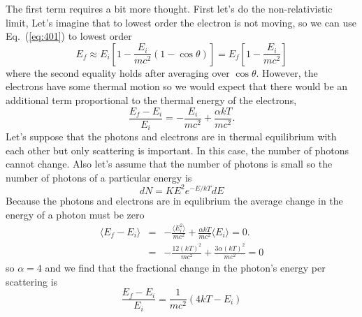 The first term requires a bit more thought.   First let's do the
non-relativistic limit,  Let's imagine that to lowest order the
electron is not moving, so we can use Eq.~(\ref{eq:401}) to lowest order
\begin{equation}
E_f \approx E_i \left [ 1 - \frac{E_i}{mc^2} \left ( 1 - \cos\theta \right )
  \right ] = E_f \left [ 1 - \frac{E_i}{mc^2} \right ]
\label{eq:433}
\end{equation}
where the second equality holds after averaging over $\cos\theta$.
However, the electrons have some thermal motion so we would expect
that there would be an additional term proportional to the thermal
energy of the electrons,
\begin{equation}
\frac{E_f - E_i}{E_i} = -\frac{E_i}{mc^2}  + \frac{\alpha k T}{mc^2}.
\label{eq:434}
\end{equation}
Let's suppose that the photons and electrons are in thermal
equilibrium with each other but only scattering is important.  In this
case, the number of photons cannot change.  Also let's assume that the
number of photons is small so the number of photons of a particular
energy is
\begin{equation}
d N = K E^2 e^{-E/kT} dE
\label{eq:435}
\end{equation}
Because the photons and electrons are in equlibrium the average change
in the energy of a photon must be zero
\begin{eqnarray}
\langle E_f - E_i \rangle &=& -\frac{\langle E_i^2 \rangle}{mc^2}  +
\frac{\alpha k T}{mc^2} \langle E_i \rangle = 0. \\
&=& -\frac{12 (kT)^2}{mc^2} + \frac{3 \alpha (kT)^2}{mc^2} = 0
\label{eq:436}
\end{eqnarray}
so $\alpha=4$ and we find that the fractional change in the photon's
energy per scattering is
\begin{equation}
\frac{E_f - E_i}{E_i} = \frac{1}{mc^2}\left ( 4 k T - E_i \right )
\label{eq:437}
\end{equation}

